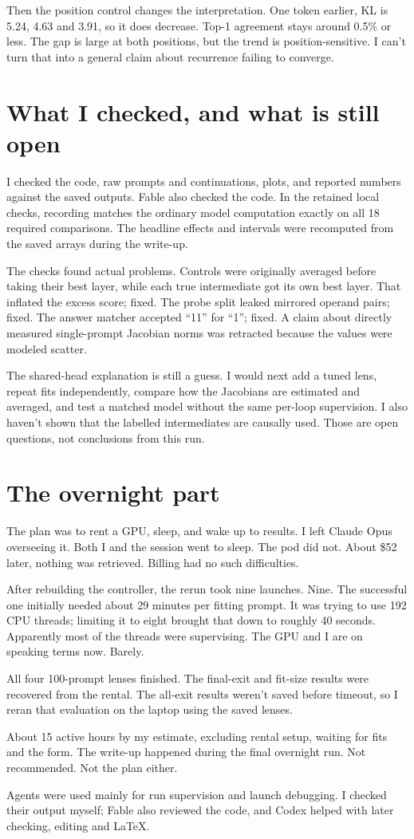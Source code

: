 \documentclass[11pt]{article}
\begin{document}
Then the position control changes the interpretation. One token earlier, KL is 5.24, 4.63 and 3.91, so it does decrease. Top-1 agreement stays around 0.5\% or less. The gap is large at both positions, but the trend is position-sensitive. I can't turn that into a general claim about recurrence failing to converge.

\section{What I checked, and what is still open}

I checked the code, raw prompts and continuations, plots, and reported numbers against the saved outputs. Fable also checked the code. In the retained local checks, recording matches the ordinary model computation exactly on all 18 required comparisons. The headline effects and intervals were recomputed from the saved arrays during the write-up.

The checks found actual problems. Controls were originally averaged before taking their best layer, while each true intermediate got its own best layer. That inflated the excess score; fixed. The probe split leaked mirrored operand pairs; fixed. The answer matcher accepted “11” for “1”; fixed. A claim about directly measured single-prompt Jacobian norms was retracted because the values were modeled scatter.

The shared-head explanation is still a guess. I would next add a tuned lens, repeat fits independently, compare how the Jacobians are estimated and averaged, and test a matched model without the same per-loop supervision. I also haven't shown that the labelled intermediates are causally used. Those are open questions, not conclusions from this run.

\section{The overnight part}

The plan was to rent a GPU, sleep, and wake up to results. I left Claude Opus overseeing it. Both I and the session went to sleep. The pod did not. About \$52 later, nothing was retrieved. Billing had no such difficulties.

After rebuilding the controller, the rerun took nine launches. Nine. The successful one initially needed about 29 minutes per fitting prompt. It was trying to use 192 CPU threads; limiting it to eight brought that down to roughly 40 seconds. Apparently most of the threads were supervising. The GPU and I are on speaking terms now. Barely.

All four 100-prompt lenses finished. The final-exit and fit-size results were recovered from the rental. The all-exit results weren't saved before timeout, so I reran that evaluation on the laptop using the saved lenses.

About 15 active hours by my estimate, excluding rental setup, waiting for fits and the form. The write-up happened during the final overnight run. Not recommended. Not the plan either.

Agents were used mainly for run supervision and launch debugging. I checked their output myself; Fable also reviewed the code, and Codex helped with later checking, editing and LaTeX.
\end{document}
